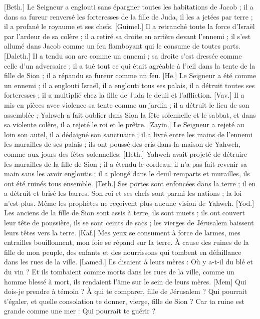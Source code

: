 \begin{multicols}{2}
[Beth.] Le Seigneur a englouti sans épargner toutes les habitations de Jacob ; il a dans sa fureur renversé les forteresses de la fille de Juda, il les a jetées par terre ; il a profané le royaume et ses chefs.
[Guimel.] Il a retranché toute la force d'Israël par l'ardeur de sa colère ; il a retiré sa droite en arrière devant l'ennemi ; il s'est allumé dans Jacob comme un feu flamboyant qui le consume de toutes parts.
[Daleth.] Il a tendu son arc comme un ennemi ; sa droite s'est dressée comme celle d'un adversaire ; il a tué tout ce qui était agréable à l'œil dans la tente de la fille de Sion ; il a répandu sa fureur comme un feu.
[He.] Le Seigneur a été comme un ennemi ; il a englouti Israël, il a englouti tous ses palais, il a détruit toutes ses forteresses ; il a multiplié chez la fille de Juda le deuil et l'affliction.
[Vav.] Il a mis en pièces avec violence sa tente comme un jardin ; il a détruit le lieu de son assemblée ; Yahweh a fait oublier dans Sion la fête solennelle et le sabbat, et dans sa violente colère, il a rejeté le roi et le prêtre.
[Zayin.] Le Seigneur a rejeté au loin son autel, il a dédaigné son sanctuaire ; il a livré entre les mains de l'ennemi les murailles de ses palais ; ils ont poussé des cris dans la maison de Yahweh, comme aux jours des fêtes solennelles.
[Heth.] Yahweh avait projeté de détruire les murailles de la fille de Sion ; il a étendu le cordeau, il n'a pas fait revenir sa main sans les avoir engloutis ; il a plongé dans le deuil remparts et murailles, ils ont été ruinés tous ensemble.
[Teth.] Ses portes sont enfoncées dans la terre ; il en a détruit et brisé les barres. Son roi et ses chefs sont parmi les nations ; la loi n'est plus. Même les prophètes ne reçoivent plus aucune vision de Yahweh.
[Yod.] Les anciens de la fille de Sion sont assis à terre, ils sont muets ; ils ont couvert leur tête de poussière, ils se sont ceints de sacs ; les vierges de Jérusalem baissent leurs têtes vers la terre.
[Kaf.] Mes yeux se consument à force de larmes, mes entrailles bouillonnent, mon foie se répand sur la terre. À cause des ruines de la fille de mon peuple, des enfants et des nourrissons qui tombent en défaillance dans les rues de la ville.
[Lamed.] Ils disaient à leurs mères : Où y a-t-il du blé et du vin ? Et ils tombaient comme morts dans les rues de la ville, comme un homme blessé à mort, ils rendaient l'âme sur le sein de leurs mères.
[Mem] Qui dois-je prendre à témoin ? À qui te comparer, fille de Jérusalem ? Qui pourrait t'égaler, et quelle consolation te donner, vierge, fille de Sion ? Car ta ruine est grande comme une mer : Qui pourrait te guérir ?

\end{multicols}

